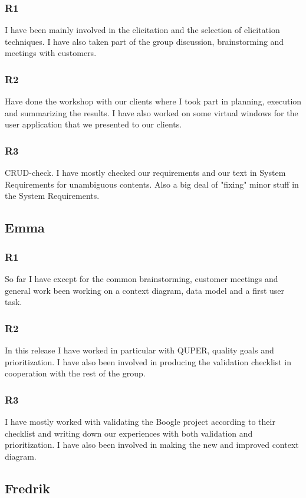 \documentclass[a4paper]{article}
\begin{document}
		\subsubsection{R1}
		I have been mainly involved in the elicitation and the selection of elicitation techniques. I have also taken part of the group discussion, brainstorming and meetings with customers.
		\subsubsection{R2}
		Have done the workshop with our clients where I took part in planning, execution and summarizing the results. I have also worked on some virtual windows for the user application that we presented to our clients. 
		\subsubsection{R3}
			CRUD-check. I have mostly checked our requirements and our text in System Requirements for unambiguous contents. Also a big deal of "fixing" minor stuff in the System Requirements.	
			
	\subsection{Emma}
		\subsubsection{R1}
		So far I have except for the common brainstorming, customer meetings and general work been working on a context diagram, data model and a first user task.
		\subsubsection{R2}
	In this release I have worked in particular with QUPER, quality goals and prioritization. I have also been involved in producing the validation checklist in cooperation with the rest of the group.
		\subsubsection{R3}
		I have mostly worked with validating the Boogle project according to their checklist and writing down our experiences with both validation and prioritization. I have also been involved in making the new and improved context diagram.
			
	\subsection{Fredrik}
\end{document}
